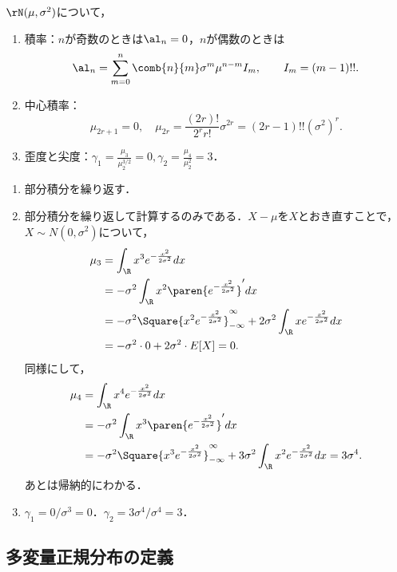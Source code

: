 \documentclass[uplatex,dvipdfmx]{jsreport}
\begin{document}
\begin{proposition}[正規分布の積率]
    $\rN(\mu,\sigma^2)$について，
    \begin{enumerate}
        \item 積率：$n$が奇数のときは$\al_n=0$，$n$が偶数のときは
        \[\al_n=\sum_{m=0}^n\comb{n}{m}\sigma^m\mu^{n-m}I_m,\qquad I_m=(m-1)!!.\]
        \item 中心積率：
        \[\mu_{2r+1}=0,\quad\mu_{2r}=\frac{(2r)!}{2^rr!}\sigma^{2r}=(2r-1)!!(\sigma^2)^r.\]
        \item 歪度と尖度：$\gamma_1=\frac{\mu_3}{\mu_2^{3/2}}=0,\gamma_2=\frac{\mu_4}{\mu_2^2}=3$．
    \end{enumerate}
\end{proposition}
\begin{Proof}\mbox{}
    \begin{enumerate}
        \item 部分積分を繰り返す．
        \item 部分積分を繰り返して計算するのみである．$X-\mu$を$X$とおき直すことで，$X\sim N(0,\sigma^2)$について，
        \begin{align*}
            \mu_3&=\int_\R x^3e^{-\frac{x^2}{2\sigma^2}}dx\\
            &=-\sigma^2\int_\R x^2\paren{e^{-\frac{x^2}{2\sigma^2}}}'dx\\
            &=-\sigma^2\Square{x^2e^{-\frac{x^2}{2\sigma^2}}}^\infty_{-\infty}+2\sigma^2\int_\R xe^{-\frac{x^2}{2\sigma^2}}dx\\
            &=-\sigma^2\cdot 0+2\sigma^2\cdot E[X]=0.
        \end{align*}
        同様にして，
        \begin{align*}
            \mu_4&=\int_\R x^4e^{-\frac{x^2}{2\sigma^2}}dx\\
            &=-\sigma^2\int_\R x^3\paren{e^{-\frac{x^2}{2\sigma^2}}}'dx\\
            &=-\sigma^2\Square{x^3e^{-\frac{x^2}{2\sigma^2}}}^\infty_{-\infty}+3\sigma^2\int_\R x^2e^{-\frac{x^2}{2\sigma^2}}dx=3\sigma^4.
        \end{align*}
        あとは帰納的にわかる．
        \item $\gamma_1=0/\sigma^{3}=0$．$\gamma_2=3\sigma^4/\sigma^4=3$．
    \end{enumerate}
\end{Proof}

\subsection{多変量正規分布の定義}
\end{document}
